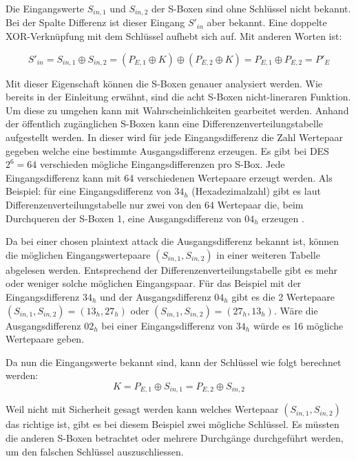 Die Eingangswerte $S_{in,1}$ und $S_{in,2}$ der S-Boxen sind ohne Schlüssel nicht bekannt. Bei der Spalte \glqq Differenz\grqq{} ist dieser Eingang $S'_{in}$ aber bekannt. Eine doppelte XOR-Verknüpfung mit dem Schlüssel aufhebt sich auf. Mit anderen Worten ist: 

\begin{equation}\label{equ:Schluessel_Differenz}
S'_{in} = S_{in,1} \oplus S_{in,2} = (P_{E,1} \oplus K) \oplus (P_{E,2} \oplus K) = P_{E,1} \oplus P_{E,2} = P'_{E} 
\end{equation}


Mit dieser Eigenschaft können die S-Boxen genauer analysiert werden. 
Wie bereits in der Einleitung erwähnt, sind die acht S-Boxen nicht-lineraren Funktion. Um diese zu umgehen kann mit Wahrscheinlichkeiten gearbeitet werden.
Anhand der öffentlich zugänglichen S-Boxen kann eine Differenzenverteilungstabelle aufgestellt werden. In dieser wird für jede Eingangsdifferenz die Zahl Wertepaar gegeben welche eine bestimmte Ausgangsdifferenz erzeugen. 
Es gibt bei DES $2^{6} = 64$ verschieden mögliche Eingangsdifferenzen pro S-Box. Jede Eingangsdifferenz kann mit 64 verschiedenen Wertepaare erzeugt werden. Als Beispiel: für eine Eingangsdifferenz von $34_{h}$ (Hexadezimalzahl) gibt es laut Differenzenverteilungstabelle nur zwei von den 64 Wertepaar die, beim Durchqueren der S-Boxen 1, eine Ausgangsdifferenz von $04_{h}$ erzeugen \cite{noauthor_differenzielle_2019}\cite{biham_differential_1990}. 

Da bei einer chosen plaintext attack die Ausgangsdifferenz bekannt ist, können die möglichen Eingangswertepaare $(S_{in,1}, S_{in,2})$ in einer weiteren Tabelle abgelesen werden. Entsprechend der Differenzenverteilungstabelle gibt es mehr oder weniger solche möglichen Eingangspaar.
Für das Beispiel mit der Eingangsdifferenz $34_{h}$ und der Ausgangsdifferenz $04_{h}$ gibt es die 2 Wertepaare $(S_{in,1}, S_{in,2}) = (13_{h}, 27_{h})$ oder $(S_{in,1},S_{in,2}) = (27_{h}, 13_{h})$. Wäre die Ausgangsdifferenz $02_{h}$ bei einer Eingangsdifferenz von $34_{h}$ würde es 16 mögliche Wertepaare geben. 

Da nun die Eingangswerte bekannt sind, kann der Schlüssel wie folgt berechnet werden:
\begin{equation}\label{equ:Schluessel_Loesung}
K = P_{E,1} \oplus S_{in,1} = P_{E,2} \oplus S_{in,2}
\end{equation}

Weil nicht mit Sicherheit gesagt werden kann welches Wertepaar $(S_{in,1}, S_{in,2})$ das richtige ist, gibt es bei diesem Beispiel zwei mögliche Schlüssel. Es müssten die anderen S-Boxen betrachtet oder mehrere Durchgänge durchgeführt werden, um den falschen Schlüssel auszuschliessen. 

